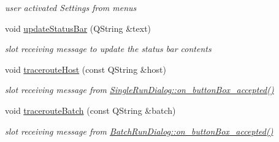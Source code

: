 \begin{CompactItemize}
\begin{CompactList}\small\item\em user activated Settings from menus \item\end{CompactList}\item 
\hypertarget{classMainWindow_bb86856c929cefa5e11fce585e6f6588}{
void \hyperlink{classMainWindow_bb86856c929cefa5e11fce585e6f6588}{updateStatusBar} (QString \&text)}
\label{classMainWindow_bb86856c929cefa5e11fce585e6f6588}

\begin{CompactList}\small\item\em slot receiving message to update the status bar contents \item\end{CompactList}\item 
\hypertarget{classMainWindow_f151b97a4e18887e851965a80bb21699}{
void \hyperlink{classMainWindow_f151b97a4e18887e851965a80bb21699}{tracerouteHost} (const QString \&host)}
\label{classMainWindow_f151b97a4e18887e851965a80bb21699}

\begin{CompactList}\small\item\em slot receiving message from \hyperlink{classSingleRunDialog_8a7ca35a48e03609bea17efb6b716642}{SingleRunDialog::on\_\-buttonBox\_\-accepted()} \item\end{CompactList}\item 
\hypertarget{classMainWindow_6c1d1f171b55114221fe6c2ffb01ac96}{
void \hyperlink{classMainWindow_6c1d1f171b55114221fe6c2ffb01ac96}{tracerouteBatch} (const QString \&batch)}
\label{classMainWindow_6c1d1f171b55114221fe6c2ffb01ac96}

\begin{CompactList}\small\item\em slot receiving message from \hyperlink{classBatchRunDialog_b52ece91fa455b57e6d04130bac90c71}{BatchRunDialog::on\_\-buttonBox\_\-accepted()} \item\end{CompactList}\end{CompactItemize}
